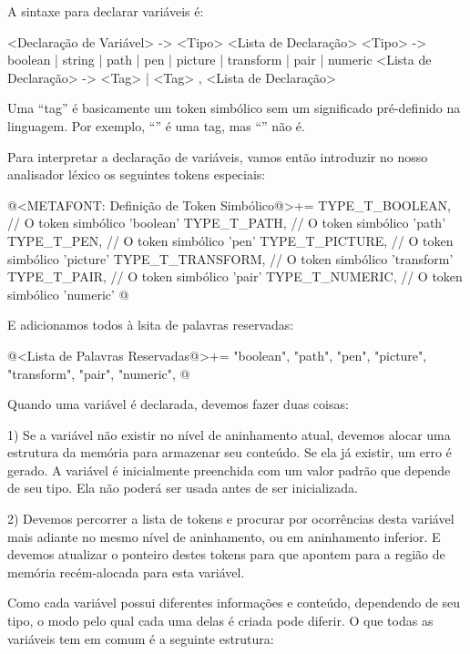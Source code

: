 
A sintaxe para declarar variáveis é:

\alinhaverbatim
<Declaração de Variável> -> <Tipo> <Lista de Declaração>
<Tipo> -> boolean | string | path | pen | picture | transform | pair |
          numeric
<Lista de Declaração> -> <Tag> | <Tag> , <Lista de Declaração>
\alinhanormal

Uma ``tag'' é basicamente um token simbólico sem um significado
pré-definido na linguagem. Por exemplo, ``'' é uma tag,
mas ``'' não é.

Para interpretar a declaração de variáveis, vamos então introduzir no
nosso analisador léxico os seguintes tokens especiais:

\iniciocodigo
@<METAFONT: Definição de Token Simbólico@>+=
TYPE_T_BOOLEAN,               // O token simbólico 'boolean'
TYPE_T_PATH,                  // O token simbólico 'path'
TYPE_T_PEN,                   // O token simbólico 'pen'
TYPE_T_PICTURE,               // O token simbólico 'picture'
TYPE_T_TRANSFORM,             // O token simbólico 'transform'
TYPE_T_PAIR,                  // O token simbólico 'pair'
TYPE_T_NUMERIC,               // O token simbólico 'numeric'
@
\fimcodigo

E adicionamos todos à lsita de palavras reservadas:

\iniciocodigo
@<Lista de Palavras Reservadas@>+=
"boolean", "path", "pen", "picture", "transform", "pair", "numeric",
@
\fimcodigo


Quando uma variável é declarada, devemos fazer duas coisas:

1) Se a variável não existir no nível de aninhamento atual, devemos
alocar uma estrutura da memória para armazenar seu conteúdo. Se ela já
existir, um erro é gerado. A variável é inicialmente preenchida com um
valor padrão que depende de seu tipo. Ela não poderá ser usada antes
de ser inicializada.

2) Devemos percorrer a lista de tokens e procurar por ocorrências
desta variável mais adiante no mesmo nível de aninhamento, ou em
aninhamento inferior. E devemos atualizar o ponteiro destes tokens
para que apontem para a região de memória recém-alocada para esta
variável.

Como cada variável possui diferentes informações e conteúdo,
dependendo de seu tipo, o modo pelo qual cada uma delas é criada pode
diferir. O que todas as variáveis tem em comum é a seguinte estrutura:

